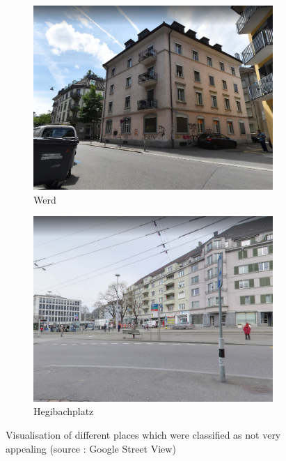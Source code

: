 \documentclass[letterpaper]{article}
\begin{document}
\begin{figure}[H]
    \begin{subfigure}[t]{.45\columnwidth}
        \centering
        \includegraphics[width=\linewidth]{images/bad/Werd.png}
        \caption[width=.9\linewidth]{Werd}
    \end{subfigure}\hspace{0.05\columnwidth}
    \begin{subfigure}[t]{.45\columnwidth}
        \centering
        \includegraphics[width=\linewidth]{images/bad/Hegibachplatz.png}
        \caption[width=.9\linewidth]{Hegibachplatz}
    \end{subfigure}\vspace{1mm}
    \caption{Visualisation of different places which were classified as not very appealing (source : Google Street View)}
    \label{fig:BadPlaces}
\end{figure}
\end{document}
